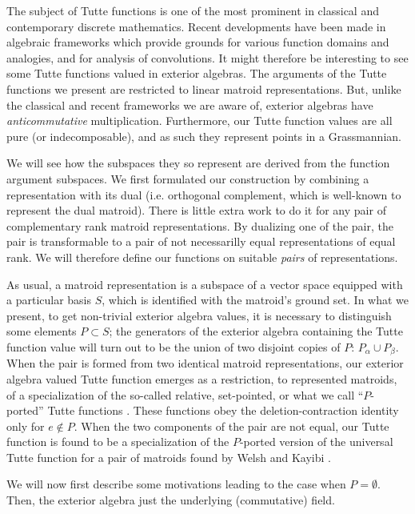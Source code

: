 \documentclass[Unicode]{cedram-alco}
\begin{document}
The subject of Tutte functions is one of the most prominent
in classical and contemporary discrete mathematics. Recent
developments have been made in algebraic frameworks which provide
grounds for various function domains and analogies,
and for analysis of convolutions.
It might therefore be interesting to see some Tutte functions valued
in exterior algebras.  The arguments of the Tutte functions we present
are restricted to linear matroid representations.
But, unlike the classical and recent frameworks
we are aware of, 
exterior algebras \cite{MarcusFDMuAlPt2} have \emph{anticommutative} multiplication.
Furthermore, our Tutte function values are all pure (or indecomposable),
and as such they represent points in a Grassmannian.

We will see how the subspaces they
so represent are derived from the function argument subspaces.  We first formulated
our construction
by combining a representation with its dual
(i.e. orthogonal complement, which is well-known to represent the dual matroid).
There is little extra work to do it for any pair of complementary rank matroid
representations.  By dualizing one of the pair, the pair is transformable to
a pair of not necessarilly equal representations of equal rank.  We will therefore
define our functions on suitable \emph{pairs} of representations.

As usual, a matroid representation is a subspace
of a vector space equipped with a particular basis $S$, which is 
identified with the matroid's ground set.  In what we present,
to get non-trivial exterior algebra values, it is necessary to
distinguish some elements $P\subset S$; the generators of the exterior algebra containing
the Tutte function value will turn out to be the union of two disjoint copies of $P$: $P_{\alpha} \cup P_{\beta}$.
When the pair is formed from two identical matroid representations, our exterior
algebra valued Tutte function emerges as a restriction, to represented matroids,
of a specialization of
the so-called relative, set-pointed, or what we call ``$P$-ported''
Tutte functions \cite{MR0419272,SetPointedLV,sdcPorted,TutteEx,RelTuttePolyDiaoHetyei}.
These functions obey the deletion-contraction
identity only for $e\not\in P$.
When the two components of the pair are not equal, our Tutte function is found
to be a specialization of the $P$-ported version of the universal Tutte function for a pair 
of matroids found by Welsh and Kayibi \cite{WelshKayibiLinking}.


We will now first describe some motivations leading to
the case when $P=\emptyset$.  Then, the exterior algebra just the underlying (commutative)
field.
\end{document}
